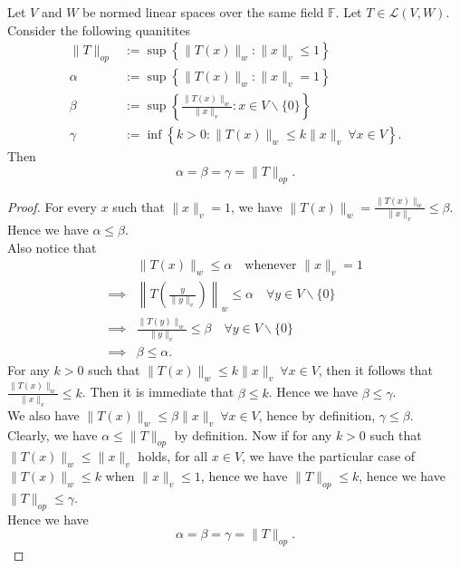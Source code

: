 \begin{prop}
    Let $V$ and $W$ be normed linear spaces over the same field $\mathbb{F}$. Let $T\in \mathcal{L}(V,W)$. Consider the following quanitites 
    $$\begin{aligned}
        \|T\|_{op}&:=\sup\left\{\|T(x)\|_{w} : \|x\|_{v}\leq 1\right\}\\
        \alpha&:=\sup\left\{\|T(x)\|_{w}:\|x\|_{v}=1\right\}\\
        \beta&:=\sup\left\{\frac{\|T(x)\|_{w}}{\|x\|_{v}}:x\in V\backslash\{0\}\right\}\\
        \gamma&:=\inf\left\{k>0:\|T(x)\|_{w}\leq k\|x\|_{v}~\forall x\in V\right\}.
    \end{aligned}$$
    Then $$\alpha=\beta=\gamma=\|T\|_{op}.$$
\end{prop}
\begin{proof}
    For every $x$ such that $\|x\|_{v}=1$, we have $\|T(x)\|_{w}=\frac{\|T(x)\|_{w}}{\|x\|_{v}}\leq\beta$. Hence we have $\alpha\leq\beta$.\\ 
    Also notice that
        $$
    \begin{aligned}
        &\|T(x)\|_{w}\leq\alpha\quad\text{whenever $\|x\|_{v}=1$}\\
        \implies &\left\|T\left(\frac{y}{\|y\|_{v}}\right)\right\|_{w}\leq\alpha\quad\forall y\in V\backslash\{0\}\\ 
        \implies &\frac{\|T(y)\|_{w}}{\|y\|_{v}}\leq \beta\quad\forall y\in V\backslash\{0\}\\ 
        \implies &\beta\leq\alpha.
    \end{aligned}
    $$
For any $k>0$ such that $\|T(x)\|_{w}\leq k\|x\|_{v}~\forall x\in V$, then it follows that $\frac{\|T(x)\|_{w}}{\|x\|_{v}}\leq k$.
Then it is immediate that $\beta\leq k$. Hence we have $\beta\leq\gamma$.\\ 
We also have $\|T(x)\|_{w}\leq\beta\|x\|_{v}~\forall x\in V$, hence by definition, $\gamma\leq\beta$.\\ 
Clearly, we have $\alpha\leq\|T\|_{op}$ by definition. Now if for any $k>0$ such that $\|T(x)\|_{w}\leq\|x\|_{v}$ holds, for all $x\in V$, we have the particular case of $\|T(x)\|_{w}\leq k$ when $\|x\|_{v}\leq1$, hence we have $\|T\|_{op}\leq k$, hence we have $\|T\|_{op}\leq\gamma$.\\ 
Hence we have $$\alpha=\beta=\gamma=\|T\|_{op}.$$
\end{proof}
\vspace{0.4cm}
